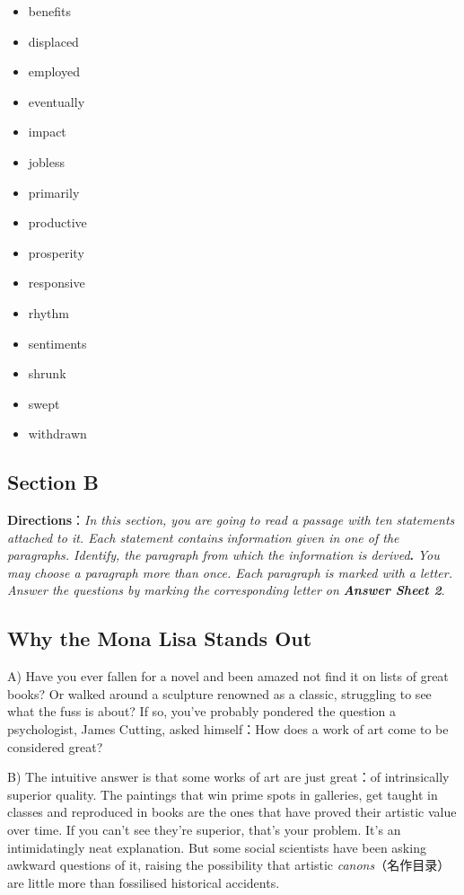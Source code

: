 \documentclass[UTF8,11pt]{ctexart}
\begin{document}
\begin{itemize}[leftmargin=2em,itemsep=.2em,topsep=.4em]\item[A.] benefits
\item[B.] displaced
\item[C.] employed
\item[D.] eventually
\item[E.] impact
\item[F.] jobless
\item[G.] primarily
\item[H.] productive
\item[I.] prosperity
\item[J.] responsive
\item[K.] rhythm
\item[L.] sentiments
\item[M.] shrunk
\item[N.] swept
\item[O.] withdrawn
\end{itemize}

\subsection*{\textbf{Section B}}


\textbf{Directions}：\textit{In this section, you are going to read a passage with ten statements attached to it. Each statement contains} \textit{information given in one of the paragraphs. Identify, the paragraph from which the information is derived}\textbf{.}\textit{ You may} \textit{choose a paragraph more than once. Each paragraph is marked with a letter. Answer the questions by marking the} \textit{corresponding letter on}\textbf{\textit{ Answer Sheet 2}}.


\subsection*{\textbf{Why the Mona Lisa Stands Out}}


A) Have you ever fallen for a novel and been amazed not find it on lists of great books? Or walked around a sculpture renowned as a classic, struggling to see what the fuss is about? If so, you’ve probably pondered the question a psychologist, James Cutting, asked himself：How does a work of art come to be considered great?


B) The intuitive answer is that some works of art are just great：of intrinsically superior quality. The paintings that win prime spots in galleries, get taught in classes and reproduced in books are the ones that have proved their artistic value over time. If you can’t see they’re superior, that’s your problem. It’s an intimidatingly neat explanation. But some social scientists have been asking awkward questions of it, raising the possibility that artistic\textit{ canons}（名作目录）are little more than fossilised historical accidents.
\end{document}
